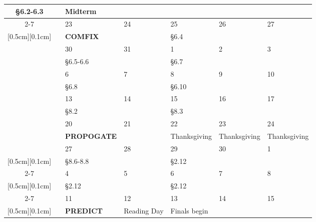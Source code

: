 \documentclass[10pt]{article}
\begin{document}
{\begin{tabular}{|c|c||p{2.9cm}|p{2.1cm}|p{2.9cm}|p{2.1cm}|p{2.1cm}|}
\S 6.2-6.3 & & \textbf{Midterm} & & \\\cline{2-7}
%
 & \multirow{2}{0.8cm}{\centering{9}} 
  & 23 & 24 & 25 & 26 & 27 \\ 
\raisebox{0cm}[0.5cm][0.1cm]{}&& 
\textbf{COMFIX} &  & \S 6.4  & & \\\hline
\multirow{8}{0.8cm}{\centering{Nov}} 
 & \multirow{2}{0.8cm}{\centering{10}} 
 & 30 & 31 & 1 & 2 & 3 \\ 
\raisebox{0cm}[0.5cm][0.1cm]{}&& 
\S 6.5-6.6 & & \S6.7 & & \\\cline{2-7}
%
 & \multirow{2}{0.8cm}{\centering{11}} 
  & 6 & 7 & 8 & 9 & 10 \\ 
\raisebox{0cm}[0.5cm][0.1cm]{}&& 
\S 6.8  & & \S6.10  & & \\\cline{2-7}
%
 & \multirow{2}{0.8cm}{\centering{12}} 
  & 13 & 14 & 15 & 16 & 17\\ 
\raisebox{0cm}[0.5cm][0.1cm]{}&& 
\S 8.2 & & \S8.3 & & \\\cline{2-7}
%
 & \multirow{2}{0.8cm}{\centering{13}} 
  & 20 & 21 & 22 & 23 & 24  \\ 
\raisebox{0cm}[0.5cm][0.1cm]{}&& 
\textbf{PROPOGATE} &  & Thanksgiving & Thanksgiving & Thanksgiving\\\hline
%
 & \multirow{2}{0.8cm}{\centering{14}} 
 & 27 & 28 & 29 & 30 & 1  \\ 
\raisebox{0cm}[0.5cm][0.1cm]{}&& 
\S8.6-8.8 & & \S 2.12 &  & \\\cline{2-7}
\multirow{3}{0.8cm}{\centering{Dec}} 
 & \multirow{2}{0.8cm}{\centering{15}} 
 & 4 & 5 & 6 & 7 & 8   \\ 
\raisebox{0cm}[0.5cm][0.1cm]{}&& 
\S 2.12 &  & \S 2.12  & & \\\cline{2-7}
%
 & \multirow{2}{0.8cm}{\centering{16}} 
 & 11 & 12 & 13 & 14 & 15 \\ 
\raisebox{0cm}[0.5cm][0.1cm]{}&& 
\textbf{PREDICT} & Reading Day & Finals begin &  & \\\hline%
%
\end{tabular}}

\newpage
\end{document}
